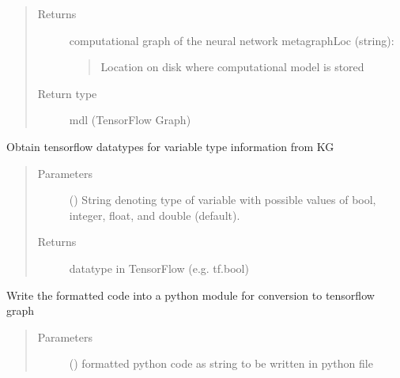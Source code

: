 \documentclass[letterpaper,10pt,english]{sphinxmanual}
\begin{document}
\begin{fulllineitems}
\begin{fulllineitems}
\begin{quote}
\begin{description}
\begin{itemize}
\end{itemize}

\item[{Returns}] \leavevmode

computational graph of the neural network
metagraphLoc (string):
\begin{quote}

Location on disk where computational model is stored
\end{quote}


\item[{Return type}] \leavevmode
mdl (TensorFlow Graph)

\end{description}\end{quote}

\end{fulllineitems}


\begin{fulllineitems}
\label{\detokenize{index:kChain.kChainModel._getVarType}}
Obtain tensorflow datatypes for variable type information from KG
\begin{quote}\begin{description}
\item[{Parameters}] \leavevmode
{} () \textendash{} String denoting type of variable with possible values of bool,
integer, float, and double (default).

\item[{Returns}] \leavevmode
datatype in TensorFlow   (e.g. tf.bool)

\end{description}\end{quote}

\end{fulllineitems}


\begin{fulllineitems}
\label{\detokenize{index:kChain.kChainModel._makePyFile}}
Write the formatted code into a python module for conversion to tensorflow graph
\begin{quote}\begin{description}
\item[{Parameters}] \leavevmode
{} () \textendash{} formatted python code as string to be written in python file


\end{description}
\end{quote}
\end{fulllineitems}
\end{fulllineitems}
\end{document}
